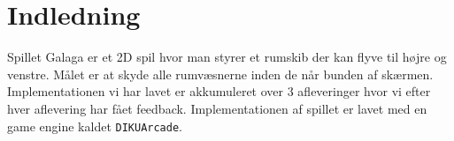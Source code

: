\section{Indledning}
Spillet Galaga er et 2D spil hvor man styrer et rumskib der kan flyve til højre og venstre. Målet er at skyde alle rumvæsnerne inden de når bunden af skærmen. Implementationen vi har lavet er akkumuleret over 3 afleveringer hvor vi efter hver aflevering har fået feedback. Implementationen af spillet er lavet med en game engine kaldet \texttt{DIKUArcade}.  
